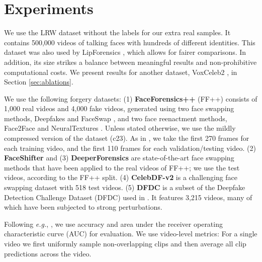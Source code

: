 \documentclass[10pt,twocolumn,letterpaper]{article}
\begin{document}
\section{Experiments}
\begin{description}[wide,itemindent=\labelsep]
\item[Auxiliary dataset.] We use the LRW dataset \cite{chung2016lip} without the labels for our extra real samples. It contains 500,000 videos of talking faces with hundreds of different identities. This dataset was also used by LipForensics \cite{haliassos2021lips}, which allows for fairer comparisons. In addition, its size strikes a balance between meaningful results and non-prohibitive computational costs. We present results for another dataset, VoxCeleb2 \cite{chung2018voxceleb2}, in Section \ref{sec:ablations}.
\item[Forgery datasets.] We use the following forgery datasets: (1) \textbf{FaceForensics++} (FF++) \cite{rossler2019faceforensics++} consists of 1,000 real videos and 4,000 fake videos, generated using two face swapping methods, Deepfakes \cite{deepfakes} and FaceSwap \cite{faceswap}, and two face reenactment methods, Face2Face \cite{thies2016face2face} and NeuralTextures \cite{thies2019deferred}. Unless stated otherwise, we use the mildly compressed version of the dataset (c23). As in \cite{haliassos2021lips, rossler2019faceforensics++}, we take the first 270 frames for each training video, and the first 110 frames for each validation/testing video. (2) \textbf{FaceShifter} \cite{li2020advancing} and (3) \textbf{DeeperForensics} \cite{jiang2020deeperforensics} are state-of-the-art face swapping methods that have been applied to the real videos of FF++; we use the test videos, according to the FF++ split. (4) \textbf{CelebDF-v2} \cite{li2020celeb} is a challenging face swapping dataset with 518 test videos. (5) \textbf{DFDC} is a subset of the Deepfake Detection Challenge Dataset (DFDC) \cite{dolhansky2020deepfake} used in \cite{haliassos2021lips}. It features 3,215 videos, many of which have been subjected to strong perturbations. 

\item[Evaluation metrics.] Following \textit{e.g.}, \cite{haliassos2021lips, zheng2021exploring, zhou2021joint, rossler2019faceforensics++, faceswap}, we use accuracy and area under the receiver operating characteristic curve (AUC) for evaluation. We use video-level metrics: For a single video we first uniformly sample non-overlapping clips and then average all clip predictions across the video.

\end{description}
\end{document}
